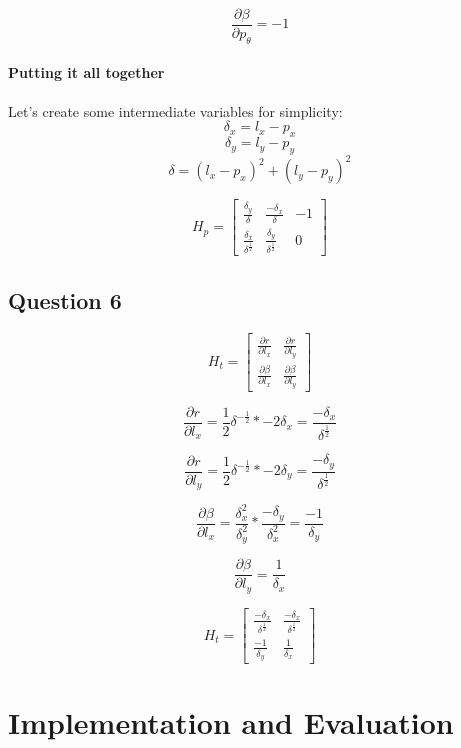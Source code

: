 \documentclass[12pt, a4paper]{article}
\begin{document}
$$\frac{\partial \beta}{\partial p_{\theta}} = -1$$

\paragraph{Putting it all together}

Let's create some intermediate variables for simplicity:
$$\delta_x = l_x - p_x$$
$$\delta_y = l_y - p_y$$
$$\delta = (l_x - p_x)^2 + (l_y - p_y)^2$$


$$H_p = 
\begin{bmatrix}
    \frac{\delta_y}{\delta} & \frac{-\delta_x}{\delta} & -1 \\
    \frac{\delta_x}{\delta^{\frac{1}{2}}} & \frac{\delta_y}{\delta^{\frac{1}{2}}}  & 0
    
\end{bmatrix}$$

\clearpage
\subsection{Question 6}

$$H_t = 
\begin{bmatrix}
    \frac{\partial r}{\partial l_x} & \frac{\partial r}{\partial l_y} \\
    \frac{\partial \beta}{\partial l_x} & \frac{\partial \beta}{\partial l_y}
\end{bmatrix}$$

$$\frac{\partial r}{\partial l_x} = \frac{1}{2} \delta^{-\frac{1}{2}} * -2\delta_x = \frac{-\delta_x}{\delta^{\frac{1}{2}}}$$

$$\frac{\partial r}{\partial l_y} = \frac{1}{2} \delta^{-\frac{1}{2}} * -2\delta_y = \frac{-\delta_y}{\delta^{\frac{1}{2}}}$$

$$\frac{\partial \beta}{\partial l_x} = \frac{\delta_x^2}{\delta_y^2} * \frac{-\delta_y}{\delta_x^2} = \frac{-1}{\delta_y}$$

$$\frac{\partial \beta}{\partial l_y} = \frac{1}{\delta_x}$$

$$H_t = 
\begin{bmatrix}
    \frac{-\delta_x}{\delta^{\frac{1}{2}}} & \frac{-\delta_x}{\delta^{\frac{1}{2}}} \\
    \frac{-1}{\delta_y} & \frac{1}{\delta_x}
\end{bmatrix}$$

\clearpage
\section{Implementation and Evaluation}
\end{document}
